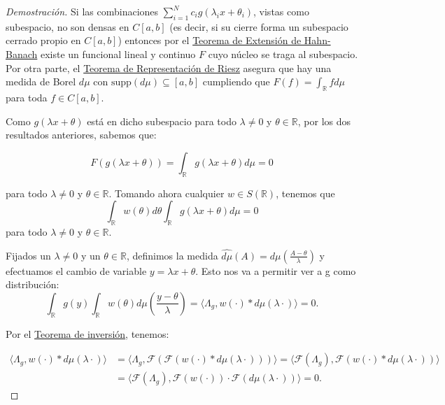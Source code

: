 \begin{proof}[Demostración]
Si las combinaciones \( \sum_{i=1}^{N} c_{i}g(\lambda_{i}x+\theta_{i})\), vistas como subespacio, no son densas en \( C[a,b]\) (es decir, si su cierre forma un subespacio cerrado propio en $C[a,b]$) entonces por el \hyperref[thm:h03]{Teorema de Extensión de Hahn-Banach} existe un funcional lineal y continuo $F$ cuyo núcleo se traga al subespacio. Por otra parte, el \hyperref[thm:h04]{Teorema de Representación de Riesz} asegura que hay una medida de Borel $d\mu$ con \( \mathrm{supp}(d\mu) \subseteq [a,b] \) cumpliendo que $F(f) = \int_{\mathds{R}}fd\mu$ para toda $f\in C[a,b]$. 

Como $g(\lambda x + \theta)$ está en dicho subespacio para todo $\lambda\neq 0$ y $\theta\in\mathds{R}$, por los dos resultados anteriores, sabemos que: 

\[F(g(\lambda x + \theta)) = \int_{\mathds{R}}g(\lambda x + \theta )d\mu = 0\]

para todo \(\lambda \neq 0\) y \(\theta \in \mathds{R}\). Tomando ahora cualquier \(w \in S(\mathds{R})\), tenemos que 
\begin{equation}
\int_{\mathds{R}}w(\theta)d\theta\int_{\mathds{R}}g(\lambda x + \theta)d\mu = 0 
\end{equation}
para todo $\lambda \neq 0$ y $\theta\in\mathds{R}$.  

Fijados un  $\lambda \neq 0$ y un $\theta\in\mathds{R}$, definimos la medida $\hat{d\mu}(A)= d\mu(\frac{A-\theta}{\lambda})$ y efectuamos el cambio de variable  \(y = \lambda x + \theta\). Esto nos va a permitir ver a g como distribución: 
\begin{equation}\label{eq:id04}
\int_{\mathds{R}}g(y) \int_{\mathds{R}}w(\theta)d\mu(\frac{y-\theta}{ \lambda}) = \langle \Lambda_{g}, w(\cdot)\ast d\mu (\lambda\cdot)\rangle = 0.
\end{equation}


Por el \hyperref[thm:d07]{Teorema de inversión}, tenemos: 


\begin{align}\label{eq:id05}
\langle \Lambda_{g}, w(\cdot)\ast d\mu (\lambda\cdot)\rangle 
& = \langle \Lambda_{g}, \mathcal{F}(\mathcal{F}( w(\cdot)\ast d\mu (\lambda\cdot)))\rangle
= \langle \mathcal{F}(\Lambda_{g}),\mathcal{F}( w(\cdot)\ast d\mu (\lambda\cdot))\rangle \nonumber \\ &
= \langle \mathcal{F}(\Lambda_{g}),\mathcal{F}( w(\cdot))\cdot \mathcal{F}(d\mu (\lambda\cdot))\rangle = 0.
\end{align}




\end{proof}
